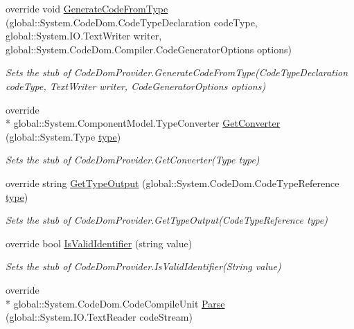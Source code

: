 \begin{DoxyCompactItemize}
override void \hyperlink{class_system_1_1_code_dom_1_1_compiler_1_1_fakes_1_1_stub_code_dom_provider_a9cbfe255624069fec66d80ae400a4c4b}{Generate\-Code\-From\-Type} (global\-::\-System.\-Code\-Dom.\-Code\-Type\-Declaration code\-Type, global\-::\-System.\-I\-O.\-Text\-Writer writer, global\-::\-System.\-Code\-Dom.\-Compiler.\-Code\-Generator\-Options options)
\begin{DoxyCompactList}\small\item\em Sets the stub of Code\-Dom\-Provider.\-Generate\-Code\-From\-Type(\-Code\-Type\-Declaration code\-Type, Text\-Writer writer, Code\-Generator\-Options options)\end{DoxyCompactList}\item 
override \\*
global\-::\-System.\-Component\-Model.\-Type\-Converter \hyperlink{class_system_1_1_code_dom_1_1_compiler_1_1_fakes_1_1_stub_code_dom_provider_aeb1b750310da3ae11f270e6c01518049}{Get\-Converter} (global\-::\-System.\-Type \hyperlink{jquery-1_810_82-vsdoc_8js_a3940565e83a9bfd10d95ffd27536da91}{type})
\begin{DoxyCompactList}\small\item\em Sets the stub of Code\-Dom\-Provider.\-Get\-Converter(\-Type type)\end{DoxyCompactList}\item 
override string \hyperlink{class_system_1_1_code_dom_1_1_compiler_1_1_fakes_1_1_stub_code_dom_provider_a45819d541ca500ddc049e967704b81cf}{Get\-Type\-Output} (global\-::\-System.\-Code\-Dom.\-Code\-Type\-Reference \hyperlink{jquery-1_810_82-vsdoc_8js_a3940565e83a9bfd10d95ffd27536da91}{type})
\begin{DoxyCompactList}\small\item\em Sets the stub of Code\-Dom\-Provider.\-Get\-Type\-Output(\-Code\-Type\-Reference type)\end{DoxyCompactList}\item 
override bool \hyperlink{class_system_1_1_code_dom_1_1_compiler_1_1_fakes_1_1_stub_code_dom_provider_ae6e53779912e2bb924c78abe65f32a9b}{Is\-Valid\-Identifier} (string value)
\begin{DoxyCompactList}\small\item\em Sets the stub of Code\-Dom\-Provider.\-Is\-Valid\-Identifier(\-String value)\end{DoxyCompactList}\item 
override \\*
global\-::\-System.\-Code\-Dom.\-Code\-Compile\-Unit \hyperlink{class_system_1_1_code_dom_1_1_compiler_1_1_fakes_1_1_stub_code_dom_provider_ae5ea9d9b6ce730a9296a0e8d0a3ad675}{Parse} (global\-::\-System.\-I\-O.\-Text\-Reader code\-Stream)

\end{DoxyCompactItemize}
